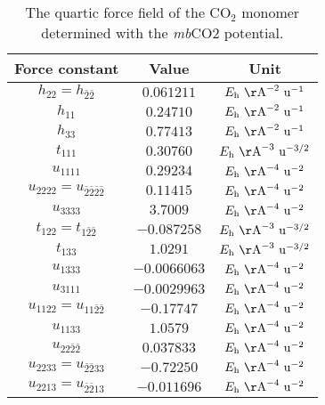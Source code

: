 \documentclass[aip,jcp,showpacs,superscriptaddress,groupedaddress]{revtex4-1}  %
\begin{document}
\begin{table}[]
\centering
\caption{The quartic force field of the CO$_2$ monomer determined with the \emph{mb}CO2 potential.}
\label{table:qff_monomer}
\begin{ruledtabular}
\begin{tabular}{ccc}
Force constant & Value        & Unit         \\
\hline \Tstrut
$h_{22}=h_{\bar{2}\bar{2}}$        & $0.061211$  & $E_{\rm h}\ {\rm \AA}^{-2}\ {\rm u}^{-1}$   \\
$h_{11}$            & $0.24710$   & $E_{\rm h}\ {\rm \AA}^{-2}\ {\rm u}^{-1}$   \\
$h_{33}$            & $0.77413$  & $E_{\rm h}\ {\rm \AA}^{-2}\ {\rm u}^{-1}$   \\
$t_{111}$           & $0.30760$   & $E_{\rm h}\ {\rm \AA}^{-3}\ {\rm u}^{-3/2}$ \\
$u_{1111}$          & $0.29234$  & $E_{\rm h}\ {\rm \AA}^{-4}\ {\rm u}^{-2}$ \\
$u_{2222}=u_{\bar{2}\bar{2}\bar{2}\bar{2}}$    & $0.11415$  & $E_{\rm h}\ {\rm \AA}^{-4}\ {\rm u}^{-2}$ \\
$u_{3333}$          & $3.7009$  & $E_{\rm h}\ {\rm \AA}^{-4}\ {\rm u}^{-2}$    \\
$t_{122}=t_{1\bar{2}\bar{2}}$      & $-0.087258$ & $E_{\rm h}\ {\rm \AA}^{-3}\ {\rm u}^{-3/2}$ \\
$t_{133}$           & $1.0291$  & $E_{\rm h}\ {\rm \AA}^{-3}\ {\rm u}^{-3/2}$ \\
$u_{1333}$          & $-0.0066063$ & $E_{\rm h}\ {\rm \AA}^{-4}\ {\rm u}^{-2}$    \\
$u_{3111}$          & $-0.0029963$ & $E_{\rm h}\ {\rm \AA}^{-4}\ {\rm u}^{-2}$    \\
$u_{1122}=u_{11\bar{2}\bar{2}}$    & $-0.17747$ & $E_{\rm h}\ {\rm \AA}^{-4}\ {\rm u}^{-2}$  \\
$u_{1133}$          & $1.0579$  & $E_{\rm h}\ {\rm \AA}^{-4}\ {\rm u}^{-2}$    \\
$u_{22\bar{2}\bar{2}}$          & $0.037833$  & $E_{\rm h}\ {\rm \AA}^{-4}\ {\rm u}^{-2}$    \\
$u_{2233}=u_{\bar{2}\bar{2}33}$    & $-0.72250$ & $E_{\rm h}\ {\rm \AA}^{-4}\ {\rm u}^{-2}$    \\
$u_{2213}=u_{\bar{2}\bar{2}13}$    & $-0.011696$ & $E_{\rm h}\ {\rm \AA}^{-4}\ {\rm u}^{-2}$   
\end{tabular}
\end{ruledtabular}
\end{table}
\end{document}
